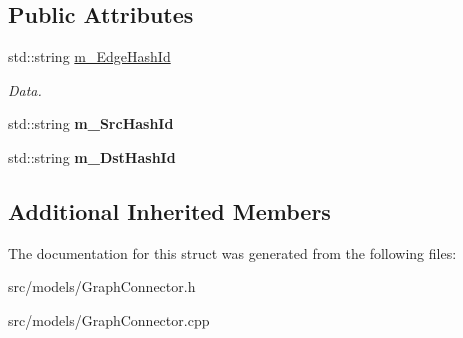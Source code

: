 \subsection*{Public Attributes}
\begin{DoxyCompactItemize}
\item 
\mbox{\label{struct_graph_connector_1_1_remove_edge_event_ab3b54ee79fd7269c7a5694cd69a33f5a}} 
std\+::string \hyperlink{struct_graph_connector_1_1_remove_edge_event_ab3b54ee79fd7269c7a5694cd69a33f5a}{m\+\_\+\+Edge\+Hash\+Id}
\begin{DoxyCompactList}\small\item\em Data. \end{DoxyCompactList}\item 
\mbox{\label{struct_graph_connector_1_1_remove_edge_event_ad21518e85c307993070826a24b5f97dc}} 
std\+::string {\bfseries m\+\_\+\+Src\+Hash\+Id}
\item 
\mbox{\label{struct_graph_connector_1_1_remove_edge_event_a20a6435da1a3c1231bec2efcec06a1fd}} 
std\+::string {\bfseries m\+\_\+\+Dst\+Hash\+Id}
\end{DoxyCompactItemize}
\subsection*{Additional Inherited Members}


The documentation for this struct was generated from the following files\+:\begin{DoxyCompactItemize}
\item 
src/models/Graph\+Connector.\+h\item 
src/models/Graph\+Connector.\+cpp\end{DoxyCompactItemize}
